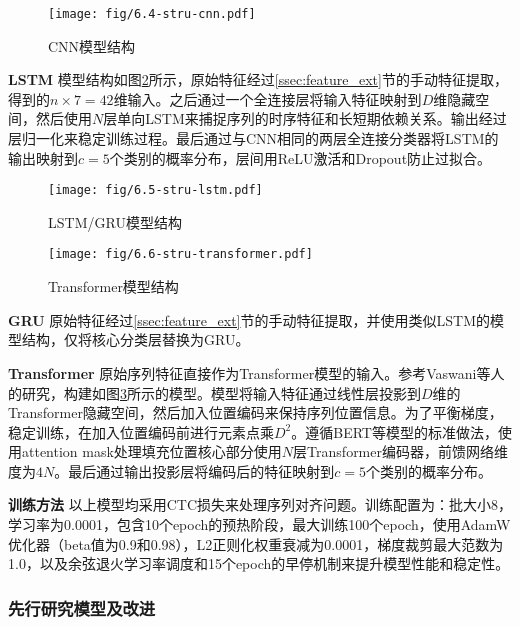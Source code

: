 \begin{figure}
    \centering
    \texttt{[image: fig/6.4-stru-cnn.pdf]}
    \caption{CNN模型结构}
    \label{fig:6.3-stru-cnn}
\end{figure}

\textbf{LSTM}\hspace{5pt} 模型结构如图\ref{fig:6.5-stru-lstm}所示，原始特征经过\ref{ssec:feature_ext}节的手动特征提取，得到的$n\times 7=42$维输入。之后通过一个全连接层将输入特征映射到$D$维隐藏空间，然后使用$N$层单向LSTM来捕捉序列的时序特征和长短期依赖关系。输出经过层归一化来稳定训练过程。最后通过与CNN相同的两层全连接分类器将LSTM的输出映射到$c=5$个类别的概率分布，层间用ReLU激活和Dropout防止过拟合。
\begin{figure}
    \centering
    \texttt{[image: fig/6.5-stru-lstm.pdf]}
    \caption{LSTM/GRU模型结构}
    \label{fig:6.5-stru-lstm}
\end{figure}

\begin{figure}
    \centering
    \texttt{[image: fig/6.6-stru-transformer.pdf]}
    \caption{Transformer模型结构}
    \label{fig:6.6-stru-transformer}
\end{figure}

\textbf{GRU}\hspace{5pt} 原始特征经过\ref{ssec:feature_ext}节的手动特征提取，并使用类似LSTM的模型结构，仅将核心分类层替换为GRU。

\textbf{Transformer}\hspace{5pt} 原始序列特征直接作为Transformer模型的输入。参考Vaswani\cites{vaswani2017attention}等人的研究，构建如图\ref{fig:6.6-stru-transformer}所示的模型。模型将输入特征通过线性层投影到$D$维的Transformer隐藏空间，然后加入位置编码来保持序列位置信息。为了平衡梯度，稳定训练，在加入位置编码前进行元素点乘$D^2$。遵循BERT等模型的标准做法，使用attention mask处理填充位置\cites{devlin2019bert}核心部分使用$N$层Transformer编码器，前馈网络维度为$4N$。最后通过输出投影层将编码后的特征映射到$c=5$个类别的概率分布。

\textbf{训练方法}\hspace{5pt} 以上模型均采用CTC损失来处理序列对齐问题。训练配置为：批大小8，学习率为0.0001，包含10个epoch的预热阶段，最大训练100个epoch，使用AdamW优化器（beta值为0.9和0.98），L2正则化权重衰减为0.0001，梯度裁剪最大范数为1.0，以及余弦退火学习率调度和15个epoch的早停机制来提升模型性能和稳定性。

\subsubsection{先行研究模型及改进}\label{sssec:sed_ar_ctc}

